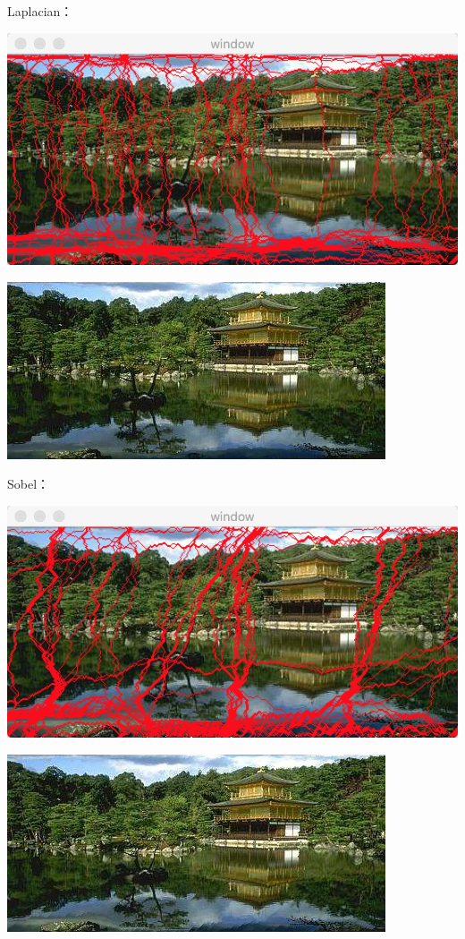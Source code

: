 \documentclass[10pt, a4paper]{article}
\begin{document}
    Laplacian：

    \includegraphics[scale = .3]{inputLapseam.jpeg}

    \includegraphics[scale = .3]{inputLap.jpg}

    Sobel：

    \includegraphics[scale = .3]{inputSobelseam.jpeg}

    \includegraphics[scale = .3]{inputSobel.jpg}
\end{document}
